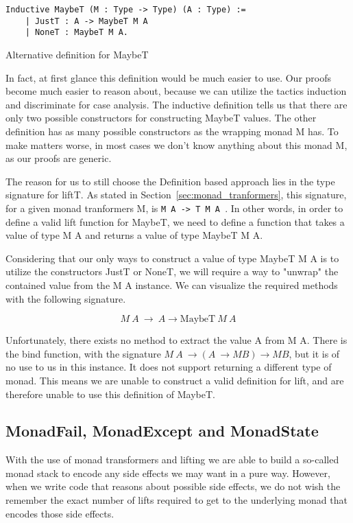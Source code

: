 \begin{listing}
\begin{verbatim}
Inductive MaybeT (M : Type -> Type) (A : Type) :=
    | JustT : A -> MaybeT M A
    | NoneT : MaybeT M A.
\end{verbatim}
\caption{Alternative definition for MaybeT}
\label{lst:alternative_maybeT}
\end{listing}

In fact, at first glance this definition would be much easier to use. Our
proofs become much easier to reason about, because we can utilize the tactics
induction and discriminate for case analysis. The inductive definition tells us
that there are only two possible constructors for constructing MaybeT values.
The other definition has as many possible constructors as the wrapping monad M
has. To make matters worse, in most cases we don't know anything about this
monad M, as our proofs are generic.

The reason for us to still choose the Definition based approach lies in the
type signature for liftT. As stated in Section~\ref{sec:monad_tranformers},
this signature, for a given monad tranformers M, is 
\texttt{M A -> T M A }. In other words, in order to define a valid
lift function for MaybeT, we need to define a function that takes a value of
type M A and returns a value of type MaybeT M A.

Considering that our only ways to construct a value of type MaybeT M A is to
utilize the constructors JustT or NoneT, we will require a way to "unwrap" the
contained value from the M A instance. We can visualize the required methods
with the following signature.

\begin{equation}
    M\ A\ \rightarrow\ A \rightarrow \text{MaybeT}\ M\ A
\end{equation}

Unfortunately, there exists no method to extract the value A from M A. There is
the bind function, with the signature 
$M\ A\ \rightarrow (A\ \rightarrow M B) \rightarrow M B$, but it is of no use
to us in this instance. It does not support returning a different type of
monad. This means we are unable to construct a valid definition for lift, and
are therefore unable to use this definition of MaybeT.

\subsection{MonadFail, MonadExcept and MonadState}
With the use of monad transformers and lifting we are able to build a so-called 
monad stack to encode any side effects we may want in a pure way. However, when
we write code that reasons about possible side effects, we do not wish the
remember the exact number of lifts required to get to the underlying monad that
encodes those side effects. 


